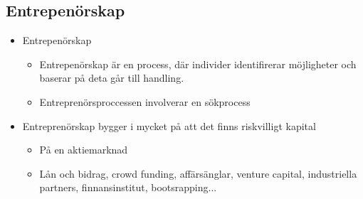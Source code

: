 \begin{multicols}{2}
\subsection{Entrepenörskap}
\begin{itemize}
    \item Entrepenörskap
    \begin{itemize}
        \item Entrepenörskap är en process, där individer identifirerar möjligheter och baserar på deta går till handling.
        \item Entreprenörsproccessen involverar en sökprocess
    \end{itemize}
    \item Entreprenörskap bygger i mycket på att det finns riskvilligt kapital
    \begin{itemize}
        \item På en aktiemarknad 
        \item Lån och bidrag, crowd funding, affärsänglar, venture capital, industriella partners, finnansinstitut, bootsrapping...
    \end{itemize}
\end{itemize}


\end{multicols}
